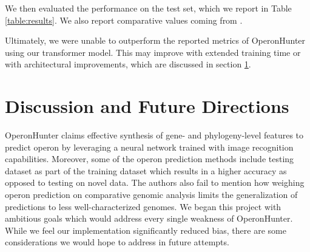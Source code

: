 \documentclass{article}
\begin{document}
We then evaluated the performance on the test set, which we report in Table \ref{table:results}. We also report comparative values coming from \citet{assaf_detecting_2021}.


Ultimately, we were unable to outperform the reported metrics of OperonHunter using our transformer model. This may improve with extended training time or with architectural improvements, which are discussed in section \ref{discussion}.

\section{Discussion and Future Directions} \label{discussion}

OperonHunter claims effective synthesis of gene- and phylogeny-level features to predict operon by leveraging a neural network trained with image recognition capabilities. Moreover, some of the operon prediction methods include testing dataset as part of the training dataset which results in a higher accuracy as opposed to testing on novel data. The authors also fail to mention how weighing operon prediction on comparative genomic analysis limits the generalization of predictions to less well-characterized genomes. We began this project with ambitious goals which would address every single weakness of OperonHunter. While we feel our implementation significantly reduced bias, there are some considerations we would hope to address in future attempts.

 

\end{document}
